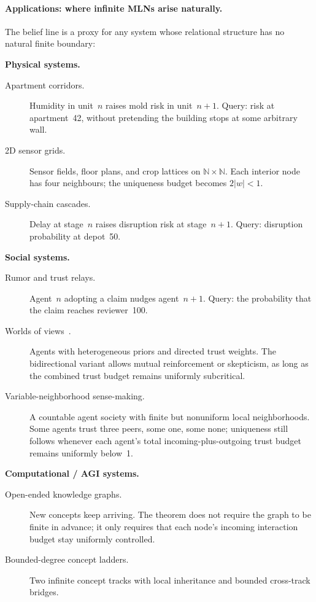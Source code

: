 \documentclass[11pt,openany]{report}
\begin{document}
\paragraph{Applications: where infinite MLNs arise naturally.}
The belief line is a proxy for any system whose relational structure has no
natural finite boundary:

\smallskip\noindent\textbf{Physical systems.}
\begin{description}
\item[Apartment corridors.]  Humidity in unit~$n$ raises mold risk in
  unit~$n{+}1$.  Query: risk at apartment~42, without pretending the building
  stops at some arbitrary wall.
\item[2D sensor grids.]  Sensor fields, floor plans, and crop lattices
  on $\mathbb{N}\times\mathbb{N}$.  Each interior node has four neighbours;
  the uniqueness budget becomes $2|w|<1$.
\item[Supply-chain cascades.]  Delay at stage~$n$ raises disruption risk at
  stage~$n{+}1$.  Query: disruption probability at depot~50.
\end{description}

\smallskip\noindent\textbf{Social systems.}
\begin{description}
\item[Rumor and trust relays.]  Agent~$n$ adopting a claim nudges
  agent~$n{+}1$.  Query: the probability that the claim reaches reviewer~100.
\item[Worlds of views~\cite{VeitasWeinbaum2015}.]  Agents with heterogeneous
  priors and directed trust weights.  The bidirectional variant allows mutual
  reinforcement or skepticism, as long as the combined trust budget remains
  uniformly subcritical.
\item[Variable-neighborhood sense-making.]  A countable agent society with
  finite but nonuniform local neighborhoods.  Some agents trust three peers,
  some one, some none; uniqueness still follows whenever each agent's total
  incoming-plus-outgoing trust budget remains uniformly below~1.
\end{description}

\smallskip\noindent\textbf{Computational / AGI systems.}
\begin{description}
\item[Open-ended knowledge graphs.]  New concepts keep arriving.  The theorem
  does not require the graph to be finite in advance; it only requires that
  each node's incoming interaction budget stay uniformly controlled.
\item[Bounded-degree concept ladders.]  Two infinite concept tracks with local
  inheritance and bounded cross-track bridges.
\end{description}
\end{document}
